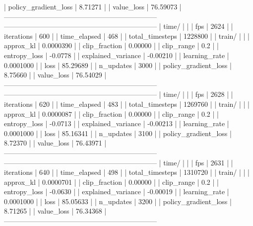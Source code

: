 |    policy_gradient_loss |      8.71271 |
|    value_loss           |     76.59073 |
------------------------------------------------------------------
------------------------------------------------------------------
| time/                   |              |
|    fps                  |         2624 |
|    iterations           |          600 |
|    time_elapsed         |          468 |
|    total_timesteps      |      1228800 |
| train/                  |              |
|    approx_kl            |    0.0000390 |
|    clip_fraction        |      0.00000 |
|    clip_range           |          0.2 |
|    entropy_loss         |      -0.0778 |
|    explained_variance   |     -0.00210 |
|    learning_rate        |    0.0001000 |
|    loss                 |     85.29689 |
|    n_updates            |         3000 |
|    policy_gradient_loss |      8.75660 |
|    value_loss           |     76.54029 |
------------------------------------------------------------------
------------------------------------------------------------------
| time/                   |              |
|    fps                  |         2628 |
|    iterations           |          620 |
|    time_elapsed         |          483 |
|    total_timesteps      |      1269760 |
| train/                  |              |
|    approx_kl            |    0.0000087 |
|    clip_fraction        |      0.00000 |
|    clip_range           |          0.2 |
|    entropy_loss         |      -0.0713 |
|    explained_variance   |     -0.00213 |
|    learning_rate        |    0.0001000 |
|    loss                 |     85.16341 |
|    n_updates            |         3100 |
|    policy_gradient_loss |      8.72370 |
|    value_loss           |     76.43971 |
------------------------------------------------------------------
------------------------------------------------------------------
| time/                   |              |
|    fps                  |         2631 |
|    iterations           |          640 |
|    time_elapsed         |          498 |
|    total_timesteps      |      1310720 |
| train/                  |              |
|    approx_kl            |    0.0000701 |
|    clip_fraction        |      0.00000 |
|    clip_range           |          0.2 |
|    entropy_loss         |      -0.0630 |
|    explained_variance   |     -0.00019 |
|    learning_rate        |    0.0001000 |
|    loss                 |     85.05633 |
|    n_updates            |         3200 |
|    policy_gradient_loss |      8.71265 |
|    value_loss           |     76.34368 |
------------------------------------------------------------------
